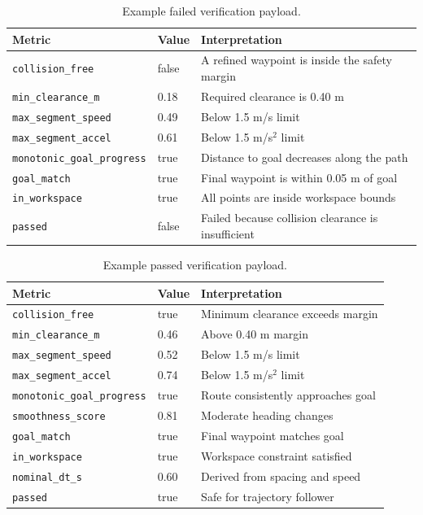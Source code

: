 \documentclass[11pt]{article}
\begin{document}
\begin{table}[H]
\centering
\caption{Example failed verification payload.}
\label{tab:failed-example}
\begin{tabular}{lll}
\toprule
Metric & Value & Interpretation \\
\midrule
\texttt{collision\_free} & false & A refined waypoint is inside the safety margin \\
\texttt{min\_clearance\_m} & 0.18 & Required clearance is 0.40 m \\
\texttt{max\_segment\_speed} & 0.49 & Below 1.5 m/s limit \\
\texttt{max\_segment\_accel} & 0.61 & Below 1.5 m/s\(^2\) limit \\
\texttt{monotonic\_goal\_progress} & true & Distance to goal decreases along the path \\
\texttt{goal\_match} & true & Final waypoint is within 0.05 m of goal \\
\texttt{in\_workspace} & true & All points are inside workspace bounds \\
\texttt{passed} & false & Failed because collision clearance is insufficient \\
\bottomrule
\end{tabular}
\end{table}

\begin{table}[H]
\centering
\caption{Example passed verification payload.}
\label{tab:passed-example}
\begin{tabular}{lll}
\toprule
Metric & Value & Interpretation \\
\midrule
\texttt{collision\_free} & true & Minimum clearance exceeds margin \\
\texttt{min\_clearance\_m} & 0.46 & Above 0.40 m margin \\
\texttt{max\_segment\_speed} & 0.52 & Below 1.5 m/s limit \\
\texttt{max\_segment\_accel} & 0.74 & Below 1.5 m/s\(^2\) limit \\
\texttt{monotonic\_goal\_progress} & true & Route consistently approaches goal \\
\texttt{smoothness\_score} & 0.81 & Moderate heading changes \\
\texttt{goal\_match} & true & Final waypoint matches goal \\
\texttt{in\_workspace} & true & Workspace constraint satisfied \\
\texttt{nominal\_dt\_s} & 0.60 & Derived from spacing and speed \\
\texttt{passed} & true & Safe for trajectory follower \\
\bottomrule
\end{tabular}
\end{table}
\end{document}
